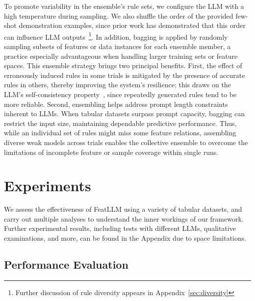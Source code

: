 To promote variability in the ensemble’s rule sets, we configure the LLM with a high temperature during sampling. We also shuffle the order of the provided few-shot demonstration examples, since prior work has demonstrated that this order can influence LLM outputs~\cite{lu2022fantastically}\footnote{Further discussion of rule diversity appears in Appendix~\ref{sec:diversity}}. In addition, bagging is applied by randomly sampling subsets of features or data instances for each ensemble member, a practice especially advantageous when handling larger training sets or feature spaces. This ensemble strategy brings two principal benefits. First, the effect of erroneously induced rules in some trials is mitigated by the presence of accurate rules in others, thereby improving the system’s resilience; this draws on the LLM’s self-consistency property~\cite{wang2022self}, since repeatedly generated rules tend to be more reliable. Second, ensembling helps address prompt length constraints inherent to LLMs. When tabular datasets surpass prompt capacity, bagging can restrict the input size, maintaining dependable predictive performance. Thus, while an individual set of rules might miss some feature relations, assembling diverse weak models across trials enables the collective ensemble to overcome the limitations of incomplete feature or sample coverage within single runs.

\section{Experiments}
We assess the effectiveness of \textsf{FeatLLM} using a variety of tabular datasets, and carry out multiple analyses to understand the inner workings of our framework. Further experimental results, including tests with different LLMs, qualitative examinations, and more, can be found in the Appendix due to space limitations.

\subsection{Performance Evaluation}
